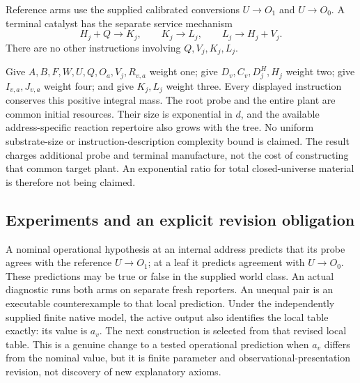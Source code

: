 \documentclass[11pt]{article}
\theoremstyle{definition}
\theoremstyle{remark}
\begin{document}
Reference arms use the supplied calibrated conversions $U\to O_1$ and
$U\to O_0$. A terminal catalyst has the separate service mechanism
\[
 H_j+Q\longrightarrow K_j,\qquad K_j\longrightarrow L_j,
 \qquad L_j\longrightarrow H_j+V_j.
\tag{T$_j$}\label{ing:terminal}
\]
There are no other instructions involving $Q,V_j,K_j,L_j$.

Give $A,B,F,W,U,Q,O_a,V_j,R_{v,a}$ weight one; give $D_v,C_v,D^H_j,H_j$
weight two; give $I_{v,a},J_{v,a}$ weight four; and give $K_j,L_j$ weight
three. Every displayed instruction conserves this positive integral
mass. The root probe and the entire plant are common initial resources.
Their size is exponential in $d$, and the available address-specific
reaction repertoire also grows with the tree. No uniform substrate-size
or instruction-description complexity bound is claimed. The result charges additional probe and
terminal manufacture, not the cost of constructing that common target
plant. An exponential ratio for total closed-universe material is therefore
not being claimed.

\subsection{Experiments and an explicit revision obligation}
A nominal operational hypothesis at an internal address predicts that its
probe agrees with the reference $U\to O_1$; at a leaf it predicts agreement
with $U\to O_0$. These predictions may be true or false in the supplied
world class. An actual diagnostic runs both arms on separate fresh
reporters. An unequal pair is an executable counterexample to that local
prediction. Under the independently supplied finite native model, the
active output also identifies the local table exactly: its value is
$a_v$. The next construction is selected from that revised local table.
This is a genuine change to a tested operational prediction when
$a_v$ differs from the nominal value, but it is finite parameter and
observational-presentation revision, not discovery of new explanatory
axioms.
\end{document}

